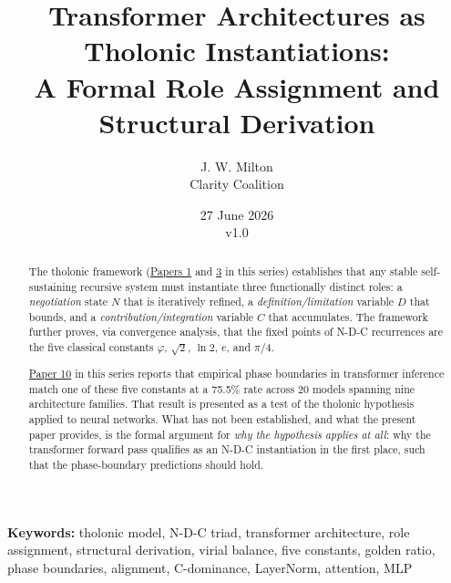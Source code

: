 \documentclass[12pt]{article}
\title{Transformer Architectures as Tholonic Instantiations:\\
\large A Formal Role Assignment and Structural Derivation}
\author{J. W. Milton\\[4pt]{\small Clarity Coalition}}
\date{\small 27 June 2026 \\ v1.0}
\begin{document}
\maketitle

\noindent\textbf{Keywords:} tholonic model, N-D-C triad, transformer architecture, role assignment, structural derivation, virial balance, five constants, golden ratio, phase boundaries, alignment, C-dominance, LayerNorm, attention, MLP

\begin{abstract}
The tholonic framework
(\href{https://github.com/baardev/truevalue/blob/main/docnav/Research/papers/1_recursive-tholonic-five-constants/1_recursive-tholonic-five-constants.pdf}{Papers
1} and
\href{https://github.com/baardev/truevalue/blob/main/docnav/Research/papers/3_minimal-recursive-triadic-framework/3_minimal-recursive-triadic-framework.pdf}{3}
in this series) establishes that any stable self-sustaining recursive
system must instantiate three functionally distinct roles: a
\emph{negotiation} state \(N\) that is iteratively refined, a
\emph{definition/limitation} variable \(D\) that bounds, and a
\emph{contribution/integration} variable \(C\) that accumulates. The
framework further proves, via convergence analysis, that the fixed
points of N-D-C recurrences are the five classical constants
\(\varphi\), \(\sqrt{2}\), \(\ln 2\), \(e\), and \(\pi/4\).

\href{https://github.com/baardev/truevalue/blob/main/docnav/Research/papers/10_tholonic-neural-architecture/10_tholonic-neural-architecture.pdf}{Paper
10} in this series reports that empirical phase boundaries in
transformer inference match one of these five constants at a 75.5\% rate
across 20 models spanning nine architecture families. That result is
presented as a test of the tholonic hypothesis applied to neural
networks. What has not been established, and what the present paper
provides, is the formal argument for \emph{why the hypothesis applies at
all}: why the transformer forward pass qualifies as an N-D-C
instantiation in the first place, such that the phase-boundary
predictions should hold.


\end{abstract}
\end{document}

